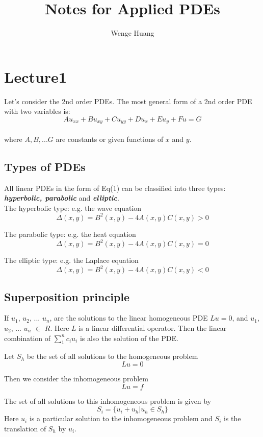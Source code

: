 \documentclass[12pt]{article} %
\title{Notes for Applied PDEs}
\author{Wenge Huang}
\begin{document}
\maketitle

\section{Lecture1} 


\hspace{5mm}
Let's consider the 2nd order PDEs. The most general form of a 2nd order PDE with two variables is:\\
\begin{equation}  
Au_{xx}+Bu_{xy}+Cu_{yy}+Du_{x}+Eu_{y}+Fu=G
\end{equation} \\
where  $A, B, ... G$ are constants or given functions of $x$ and $y$.\par
\subsection{Types of PDEs}
\hspace{5mm}All linear PDEs in the form of Eq(1) can be classified into three types:  \emph {\textbf{hyperbolic, parabolic}} and \emph{\textbf{elliptic}}.\\

The hyperbolic type: e.g. the wave equation 
\begin{equation}
\Delta (x, y) = B^{2}(x, y) - 4A(x, y)C(x, y) >0
\end{equation}
\par
The parabolic type: e.g. the heat equation
\begin{equation}
\Delta (x, y) = B^{2}(x, y) - 4A(x, y)C(x, y) =0
\end{equation}
\par
The elliptic type: e.g. the Laplace equation
\begin{equation}
\Delta (x, y) = B^{2}(x, y) - 4A(x, y)C(x, y) <0
\end{equation}\par


\subsection{Superposition principle}
\hspace{5mm}
If $u_{1}$, $u_{2}$, ... $u_{n}$, are the solutions to the linear homogeneous PDE $Lu = 0$, and $u_{1}$, $u_{2}$, ... $u_{n}$ $\in$ $R$. Here $L$ is a linear differential operator.  Then the linear combination of $\sum_{1}^{n}c_{i}u_{i}$ is also the solution of the PDE.\par
Let $S_{h}$ be the set of all solutions to the homogeneous problem $$Lu = 0$$ \par
Then we consider the inhomogeneous problem$$Lu = f$$\par
The set of all solutions to this inhomogeneous problem is given by
$$
S_{i}=\{u_{i}+u_{h}| u_{h} \in S_{h}\}
$$Here $u_{i}$ is a particular solution to the inhomogeneous problem and $S_{i}$ is the translation of $S_{h}$ by $u_{i}$.\par
\end{document}
